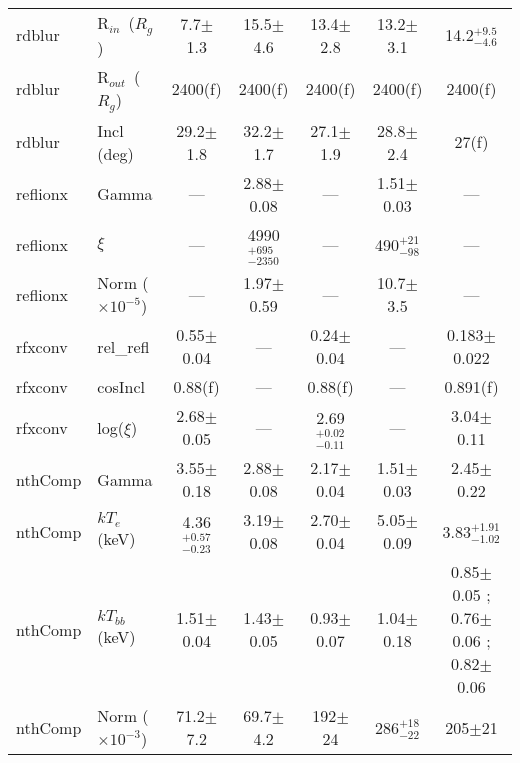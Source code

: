 \documentclass{aa}
\begin{document}
\begin{table*}
\begin{tabular}{llccccc}
rdblur & 
R$_{in}\,$ ($R_g$) &
7.7$\pm$1.3 &
15.5$\pm$4.6&
13.4$\pm$2.8&
13.2$\pm$3.1&
14.2$^{+9.5}_{-4.6}$\\

rdblur & 
R$_{out}\,$ ($R_g$)  & 
2400(f) &
2400(f) &
2400(f) &
2400(f) &
2400(f) \\


rdblur & 
Incl (deg)   & 
29.2$\pm$1.8 &
32.2$\pm$1.7 & 
27.1$\pm$1.9 &
28.8$\pm$2.4&
27(f) \\

\hline


reflionx & 
Gamma   & 
--- &
2.88$\pm$0.08 & 
--- &
1.51$\pm$0.03 &
--- \\




reflionx & 
$\xi$   & 
--- & 
4990$^{+695}_{-2350}$ &
--- &
490$^{+21}_{-98}$  &
---  \\

reflionx & 
Norm ($\times10^{-5}$)   & 
--- & 
1.97$\pm$0.59 & 
--- &
10.7$\pm$3.5 &
--- \\





\hline

rfxconv & 
rel\_refl    & 
0.55$\pm$0.04 &
--- & 
0.24$\pm$0.04 &
---  &
0.183$\pm$0.022  \\


rfxconv & 
cosIncl  & 
0.88(f)&
--- & 
0.88(f) &
--- &
0.891(f) \\

rfxconv & 
log($\xi$)   & 
2.68$\pm$0.05 &
--- & 
2.69$^{+0.02}_{-0.11}$&
--- &
3.04$\pm$0.11\\


\hline

nthComp &
Gamma   & 
3.55$\pm$0.18 &
2.88$\pm$0.08 & 
2.17$\pm$0.04 &
1.51$\pm$0.03 &
2.45$\pm$0.22 \\


nthComp & 
$kT_{e}\,$(keV) & 
4.36$^{+0.57}_{-0.23}$ &
3.19$\pm$0.08 &
2.70$\pm$0.04 &
5.05$\pm$0.09 &
3.83$^{+1.91}_{-1.02}$ \\


  
  
nthComp & 
$kT_{bb}\,$(keV) & 
1.51$\pm$0.04 &
1.43$\pm$0.05 &
0.93$\pm$0.07&
1.04$\pm$0.18 &  
0.85$\pm$0.05  ;  0.76$\pm$0.06 ;  0.82$\pm$0.06 \\ 
  
  
  

nthComp & 
Norm ($\times10^{-3}$)   & 
71.2$\pm$7.2  &
69.7$\pm$4.2 &
192$\pm$24 &
286$^{+18}_{-22}$ &
205$\pm$21 \\






\end{tabular}
\end{table*}
\end{document}
